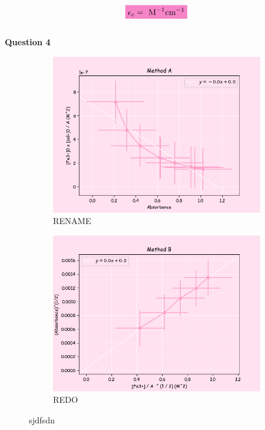 \begin{equation}
   \mathcolorbox{Lavender}{ \epsilon_c =  \text{ M}^{-1}\text{cm} ^ {-1}}
    \label{eq:part2_ext_coeff}
\end{equation}
\\
\textbf{Question 4}
\begin{figure}[H]
     \centering
     \begin{subfigure}[b]{0.49\textwidth}
         \centering
         \includegraphics[width=\textwidth]{part2_q4a.png}
         \caption{RENAME}
         \label{fig:part2_q4_a}
     \end{subfigure}
     \hfill
     \begin{subfigure}[b]{0.49\textwidth}
         \centering
         \includegraphics[width=\textwidth]{part2_q4b.png}
         \caption{REDO}
         \label{fig:part2_q4_b}
     \end{subfigure}
     \caption{sjdfsdn}
     \label{fig:part2q4}
\end{figure}

